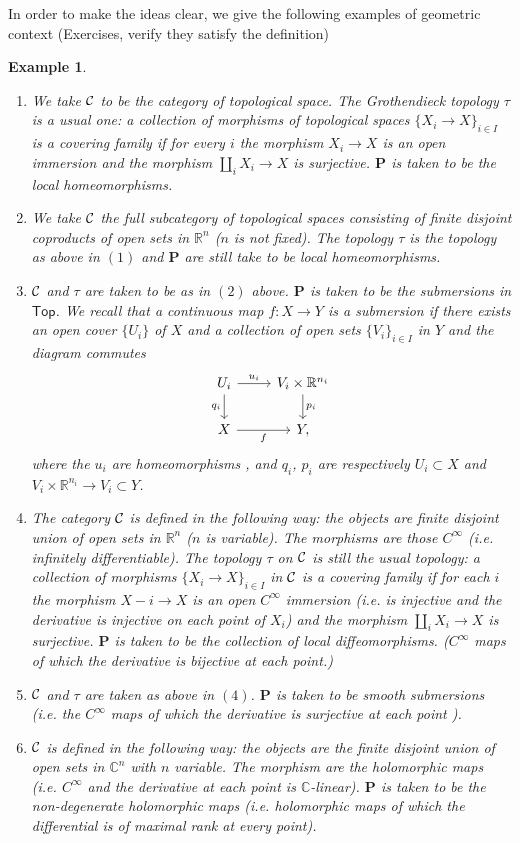 \documentclass{tufte-book} %
\numberwithin{dummy}{section}
\newtheorem{ex}[thm]{Example}
\newcommand{\reals}{\mathbb R}
\newcommand{\cplx}{\mathbb C}
\newcommand{\calc}{{\cal C}}
\newcommand{\lrta}{\longrightarrow}
\newcommand{\bfp}{\mathbf{P}}
\begin{document}
In order to make the ideas clear, we give the following examples of geometric context (Exercises, verify they satisfy the definition)
\begin{ex}\label{ex:geometric_context}\ 
\begin{enumerate}[label=(\arabic*)]
  \item
We take $\calc$ to be the category of topological space. The Grothendieck topology $\tau$ is a usual one: a collection of morphisms of topological spaces $\{X_i\lrta X\}_{i\in I}$ is a covering family if for every $i$ the morphism $X_i\lrta X$ is an open immersion and the morphism $\coprod_i X_i\lrta X$ is surjective. $\bfp$ is taken to be the local homeomorphisms.
\item We take $\calc$ the full subcategory of topological spaces consisting of finite disjoint coproducts of open sets in $\reals^n$ ($n$ is not fixed). The topology $\tau$ is the topology as above in $(1)$ and $\bfp$ are still take to be local homeomorphisms.
\item $\calc$ and $\tau$ are taken to be as in $(2)$ above. $\bfp$ is taken to be the submersions in $\mathsf{Top}$. We recall that a continuous map $f: X\lrta Y$ is a submersion if there exists an open cover $\{U_i\}$ of $X$ and a collection of open sets $\{V_i\}_{i\in I}$ in $Y$ and the diagram commutes
$$
\begin{tikzcd}
U_i \arrow[d, "q_i"'] \arrow[r, "u_i"] & V_i\times \reals^{n_i} \arrow[d, "p_i"] \\
X \arrow[r, "f"'] & Y,
\end{tikzcd}
$$
where the $u_i$ are homeomorphisms , and $q_i$, $p_i$ are respectively $U_i\subset X$ and $V_i\times \reals^{n_i}\lrta V_i\subset Y$.
\item The category $\calc$ is defined in the following way: the objects are finite disjoint union of open sets in $\reals^n$ ($n$ is variable). The morphisms are those $C^\infty$ (i.e. infinitely differentiable). The topology $\tau$ on $\calc$ is still the usual topology: a collection of morphisms $\{X_i\lrta X\}_{i\in I}$ in $\calc$ is a covering family if for each $i$ the morphism $X-i\lrta X$ is an open $C^\infty$ immersion (i.e. is injective and the derivative is injective on each point of $X_i$) and the morphism $\coprod_i X_i\lrta X$ is surjective. $\bfp$ is taken to be the collection of local diffeomorphisms. ($C^\infty$ maps of which the derivative is bijective at each point.)
\item $\calc$ and $\tau$ are taken as above in $(4)$. $\bfp$ is taken to be smooth submersions (i.e. the $C^\infty$ maps of which the derivative is surjective at each point ).
\item $\calc$ is defined in the following way: the objects are the finite disjoint union of open sets in $\cplx^n$ with $n$ variable. The morphism are the holomorphic maps (i.e. $C^\infty$ and the derivative at each point is $\cplx$-linear). $\bfp$ is taken to be the non-degenerate holomorphic maps (i.e. holomorphic maps of which the differential is of maximal rank at every point).
\end{enumerate}
\end{ex}
\end{document}
